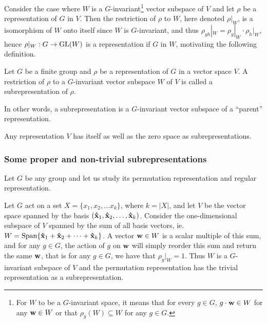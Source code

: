 Consider the case where $W$ is a $G$-invariant\footnote{For $W$ to be a $G$-invariant space, it means that for every $g \in G$, $g \cdot \mathbf{w} \in W$ for any $\mathbf{w} \in W$ or that $\rho_g(W) \subseteq W$ for any $g\in G$.} vector subspace of $V$%
and let $\rho$ be a representation of $G$ in $V$. Then the restriction of $\rho$ to $W$, here denoted $\rho|_W$, is a isomorphism of $W$ onto itself since $W$ is $G$-invariant,
and thus $\rho_{gh}|_W = \rho_g|_W \cdot \rho_h|_W$, hence $\rho|_W: G \rightarrow \text{GL}(W)$ is a representation if $G$ in $W$, motivating the following definition.

\begin{definition}[Subrepresentation]\label{def:subrepr}
	Let $G$ be a finite group and $\rho$ be a representation of $G$ in a vector space $V$. A restriction of $\rho$ to a $G$-invariant vector subspace $W$ of $V$ is called a subrepresentation of $\rho$.
\end{definition}

In other words, a subrepresentation is a $G$-invariant vector subspace of a ``parent'' representation. 

\begin{example}
	Any representation $V$ has itself as well as the zero space as subrepresentations.
\end{example}

\subsubsection{Some proper and non-trivial subrepresentations}

Let $G$ be any group and let us study its permutation representation and regular representation. 

\begin{example}\cite[Example 1.4.3.]{Sagan}\label{example:trivpermrepr}
	Let $G$ act on a set $X = \{x_1, x_2, \dots x_k\}$, where $k = |X|$, and let $V$ be the vector space spanned by the basis $(\mathbf{\hat{x}}_1, \mathbf{\hat{x}}_2, \dots, \mathbf{\hat{x}}_k)$. Consider the one-dimensional subspace of $V$ spanned by the sum of all basis vectors, ie. $W = \text{Span}\{ \mathbf{\hat{x}}_1 + \mathbf{\hat{x}}_2 + \dots + \mathbf{\hat{x}}_k \}$. A vector $\mathbf{w} \in W$ is a scalar multiple of this sum, and for any $g \in G$, the action of $g$ on $\mathbf{w}$ will simply reorder this sum and return the same $\mathbf{w}$, that is for any $g \in G$, we have that $\rho_g|_W = 1$. Thus $W$ is a $G$-invariant subspace of $V$ and the permutation representation has the trivial representation as a subrepresentation.
\end{example}

